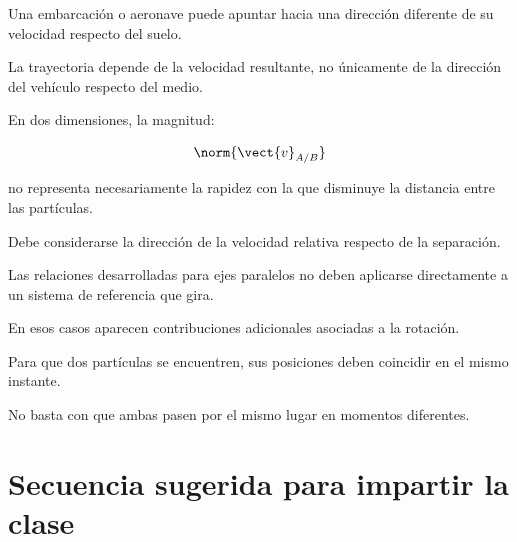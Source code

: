 \begin{errorfrecuente}

Una embarcación o aeronave puede apuntar
hacia una dirección diferente de su
velocidad respecto del suelo.

La trayectoria depende de la velocidad
resultante, no únicamente de la dirección
del vehículo respecto del medio.

\end{errorfrecuente}


\begin{errorfrecuente}

En dos dimensiones, la magnitud:

\[
\norm{\vect{v}_{A/B}}
\]

no representa necesariamente la rapidez
con la que disminuye la distancia entre
las partículas.

Debe considerarse la dirección de la
velocidad relativa respecto de la
separación.

\end{errorfrecuente}


\begin{errorfrecuente}

Las relaciones desarrolladas para ejes
paralelos no deben aplicarse directamente
a un sistema de referencia que gira.

En esos casos aparecen contribuciones
adicionales asociadas a la rotación.

\end{errorfrecuente}


\begin{errorfrecuente}

Para que dos partículas se encuentren,
sus posiciones deben coincidir
en el mismo instante.

No basta con que ambas pasen por
el mismo lugar en momentos diferentes.

\end{errorfrecuente}


\section{Secuencia sugerida para impartir la clase}

